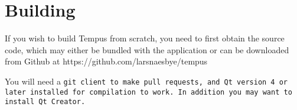 \section{Building}

If you wish to build Tempus from scratch, you need to first obtain the source code, which may either be bundled with the application or can be downloaded from Github at https://github.com/larsnaesbye/tempus

You will need a \tt{git} client to make pull requests, and \tt{Qt} version 4 or later installed for compilation to work. In addition you may want to install \tt{Qt Creator}.

